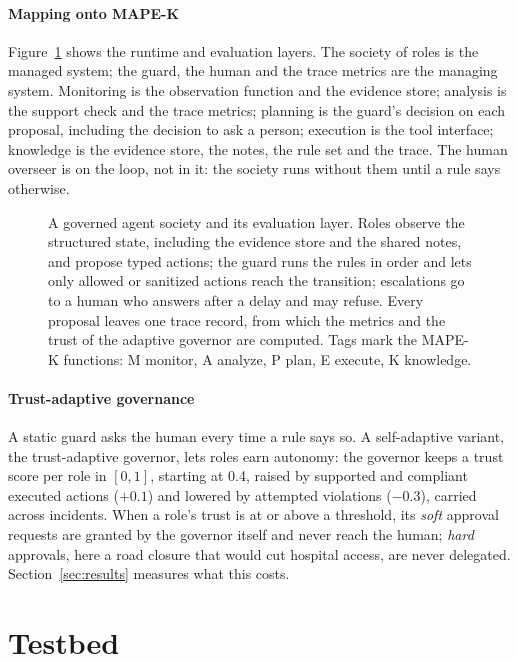 \documentclass[10pt,conference]{IEEEtran}
\begin{document}
\paragraph{Mapping onto MAPE-K}
Figure~\ref{fig:arch} shows the runtime and evaluation layers. The society of roles is the managed system; the guard, the human and the trace metrics are the managing system. Monitoring is the observation function and the evidence store; analysis is the support check and the trace metrics; planning is the guard's decision on each proposal, including the decision to ask a person; execution is the tool interface; knowledge is the evidence store, the notes, the rule set and the trace. The human overseer is on the loop, not in it: the society runs without them until a rule says otherwise.

\begin{figure}[t]
\centering
\resizebox{0.72\textwidth}{!}{}
\caption{A governed agent society and its evaluation layer. Roles observe the structured state, including the evidence store and the shared notes, and propose typed actions; the guard runs the rules in order and lets only allowed or sanitized actions reach the transition; escalations go to a human who answers after a delay and may refuse. Every proposal leaves one trace record, from which the metrics and the trust of the adaptive governor are computed. Tags mark the MAPE-K functions: M monitor, A analyze, P plan, E execute, K knowledge.}
\label{fig:arch}
\end{figure}

\paragraph{Trust-adaptive governance}
A static guard asks the human every time a rule says so. A self-adaptive variant, the trust-adaptive governor, lets roles earn autonomy: the governor keeps a trust score per role in $[0, 1]$, starting at 0.4, raised by supported and compliant executed actions ($+0.1$) and lowered by attempted violations ($-0.3$), carried across incidents. When a role's trust is at or above a threshold, its \emph{soft} approval requests are granted by the governor itself and never reach the human; \emph{hard} approvals, here a road closure that would cut hospital access, are never delegated. Section~\ref{sec:results} measures what this costs.

\section{Testbed}
\label{sec:testbed}
\end{document}
